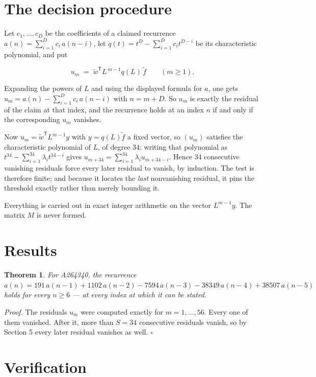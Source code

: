 \documentclass[11pt]{article}
\newtheorem{theorem}{Theorem}
\theoremstyle{definition}
\begin{document}
\section{The decision procedure}

Let $c_1,\dots,c_D$ be the coefficients of a claimed recurrence $a(n) = \sum_{i=1}^{D} c_i\,a(n-i)$, let $q(t) = t^{D} - \sum_{i=1}^{D} c_i t^{D-i}$ be its characteristic polynomial, and put

\[u_m \;=\; \tilde w^{\mathsf T} L^{\,m-1} q(L)\,\tilde f \qquad (m \ge 1).\]

Expanding the powers of $L$ and using the displayed formula for $a$, one gets $u_m = a(n) - \sum_{i=1}^{D} c_i\,a(n-i)$ with $n = m + D$. So $u_m$ is exactly the residual of the claim at that index, and the recurrence holds at an index $n$ if and only if the corresponding $u_m$ vanishes.

Now $u_m = \tilde w^{\mathsf T} L^{m-1} y$ with $y = q(L)\tilde f$ a fixed vector, so $(u_m)$ satisfies the characteristic polynomial of $L$, of degree $34$: writing that polynomial as $t^{34} - \sum_{i=1}^{34} \lambda_i t^{34-i}$ gives $u_{m+34} = \sum_{i=1}^{34} \lambda_i u_{m+34-i}$. Hence $34$ consecutive vanishing residuals force every later residual to vanish, by induction. The test is therefore finite; and because it locates the {\itshape last} nonvanishing residual, it pins the threshold exactly rather than merely bounding it.

Everything is carried out in exact integer arithmetic on the vector $L^{m-1}y$. The matrix $M$ is never formed.

\section{Results}

\begin{theorem} For A264340, the recurrence $a(n) = 191\,a(n-1) + 1102\,a(n-2) - 7594\,a(n-3) - 38349\,a(n-4) + 38507\,a(n-5)$ holds for every $n \ge 6$ --- at every index at which it can be stated.\end{theorem}

{\itshape Proof.} The residuals $u_m$ were computed exactly for $m = 1,\dots,56$. Every one of them vanished. After it, more than $S = 34$ consecutive residuals vanish, so by Section 5 every later residual vanishes as well. $\square$

\section{Verification}
\end{document}

